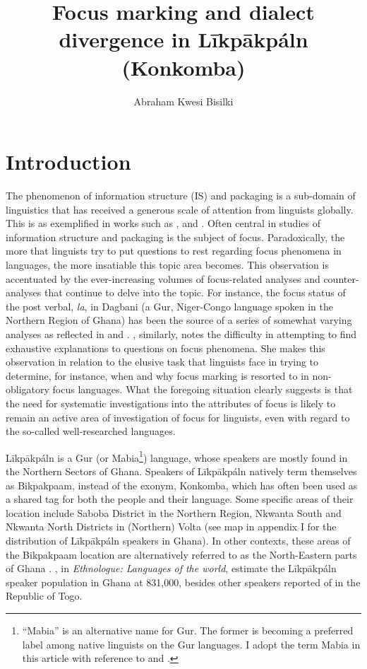 \documentclass[output=paper,colorlinks,citecolor=brown]{langscibook}
\author{Abraham Kwesi Bisilki\affiliation{University of Education, Winneba, Ghana}}
\title{Focus marking and dialect divergence in Līkpākpáln (Konkomba)}
\begin{document}
\maketitle

\section{Introduction}\label{sec:bisilki:1}

The phenomenon of information structure (IS) and packaging is a sub-domain of linguistics that has received a generous scale of attention from linguists globally. This is as exemplified in works such as \citet{Lambrecht1994, Krifka2007, SchwabeWinkler2007, Ameka2010, ZimmermannOnea2011}, and \citet{VanPutten2014}. Often central in studies of information structure and packaging is the subject of focus. Paradoxically, the more that linguists try to put questions to rest regarding focus phenomena in languages, the more insatiable this topic area becomes. This observation is accentuated by the ever-increasing volumes of focus-related analyses and counter-analyses that continue to delve into the topic. For instance, the focus status of the post verbal, \textit{la},  in Dagbani (a Gur, Niger-Congo language spoken in the Northern Region of Ghana) has been the source of a series of somewhat varying analyses as reflected in \citet{Olawsky1999,Hudu2012} and \citet{Issah2013Focus}. \Textcite[94]{VanPutten2016}, similarly, notes the difficulty in attempting to find exhaustive explanations to questions on focus phenomena. She makes this observation in relation to the elusive task that linguists face in trying to determine, for instance, when and why focus marking is resorted to in non-obligatory focus languages. What the foregoing situation clearly suggests is that the need for systematic investigations into the attributes of focus is likely to  remain an active area of investigation of focus for linguists, even with regard to the so-called well-researched languages. 

Līkpākpáln is a Gur (or Mabia\footnote{“Mabia” is an alternative name for Gur. The former is becoming a preferred label among native linguists on the Gur languages. I adopt the term Mabia in this article with reference to \citet{Bodomo2017} and \citet[161]{BodomoAbubakari2017}.}) language, whose speakers are mostly found in the Northern Sectors of Ghana. Speakers of Līkpākpáln natively term themselves as Bikpakpaam, instead of the exonym, Konkomba, which has often been used as a shared tag for both the people and their language. Some specific areas of their location include Saboba District in the Northern Region, Nkwanta South and Nkwanta North Districts in (Northern) Volta (see map in appendix I for the distribution of Līkpākpáln speakers in Ghana). In other contexts, these areas of the Bikpakpaam location are alternatively referred to as the North-Eastern parts of Ghana \citep[182]{Schwarz2009}. \citet{SimonsFennig2017, SimonsFennig2018}, in \textit{Ethnologue: Languages of the world}, estimate the Līkpākpáln speaker population in Ghana at 831,000, besides other speakers reported of in the Republic of Togo.
\end{document}
